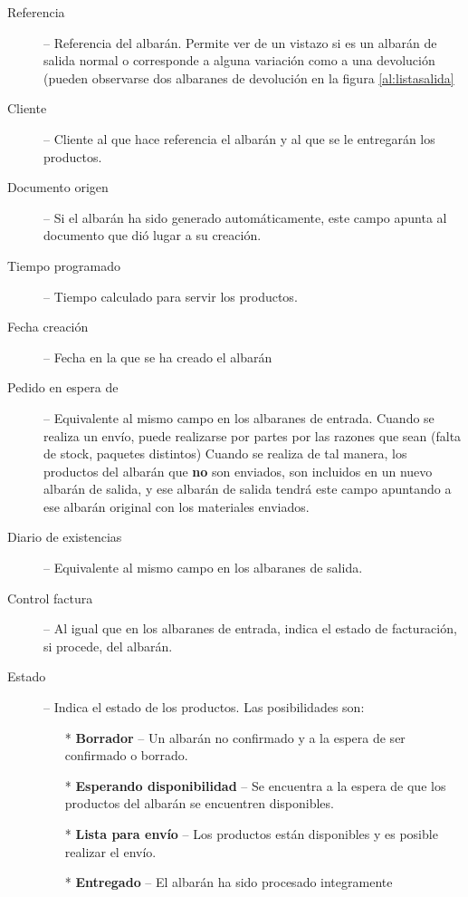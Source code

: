 \begin{description}
  \item[Referencia] -- Referencia del albarán. Permite ver de un vistazo si es un albarán de salida normal o corresponde a alguna variación como a una devolución (pueden observarse dos albaranes de devolución en la figura \ref{al:listasalida}

  \item[Cliente] -- Cliente al que hace referencia el albarán y al que se le entregarán los productos.

  \item[Documento origen] -- Si el albarán ha sido generado automáticamente, este campo apunta al documento que dió lugar a su creación.

  \item[Tiempo programado] -- Tiempo calculado para servir los productos.

  \item[Fecha creación] -- Fecha en la que se ha creado el albarán

  \item[Pedido en espera de] -- Equivalente al mismo campo en los albaranes de entrada. Cuando se realiza un envío, puede realizarse por partes por las razones que sean (falta de stock, paquetes distintos) Cuando se realiza de tal manera, los productos del albarán que \textbf{no} son enviados, son incluidos en un nuevo albarán de salida, y ese albarán de salida tendrá este campo apuntando a ese albarán original con los materiales enviados.

  \item[Diario de existencias] -- Equivalente al mismo campo en los albaranes de salida.
 
  \item[Control factura] -- Al igual que en los albaranes de entrada, indica el estado de facturación, si procede, del albarán.

  \item[Estado] -- Indica el estado de los productos. Las posibilidades son:
    \begin{itemize}
    \item[*] \textbf{Borrador} -- Un albarán no confirmado y a la espera de ser confirmado o borrado.
    \item[*] \textbf{Esperando disponibilidad} -- Se encuentra a la espera de que los productos del albarán se encuentren disponibles.
    \item[*] \textbf{Lista para envío} -- Los productos están disponibles y es posible realizar el envío.
    \item[*] \textbf{Entregado} -- El albarán ha sido procesado integramente
    \end{itemize}
\end{description}



